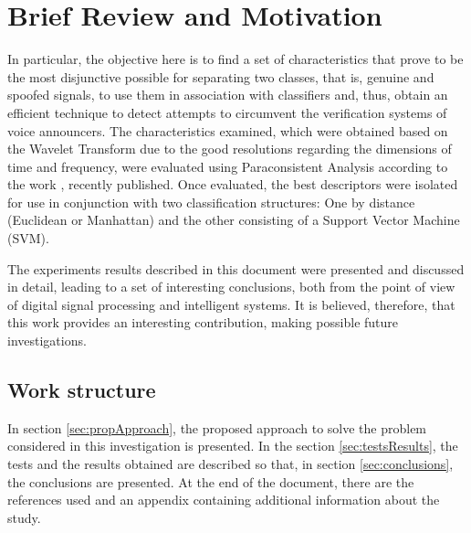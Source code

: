 \section{Brief Review and Motivation}
\label{review}
		\par In particular, the objective here is to find a set of characteristics that prove to be the most disjunctive possible for separating two classes, that is, genuine and spoofed signals, to use them in association with classifiers and, thus, obtain an efficient technique to detect attempts to circumvent the verification systems of voice announcers. The characteristics examined, which were obtained based on the Wavelet Transform due to the good resolutions regarding the dimensions of time and frequency, were evaluated using Paraconsistent Analysis according to the work \cite{8588433}, recently published. Once evaluated, the best descriptors were isolated for use in conjunction with two classification structures: One by distance (Euclidean or Manhattan) and the other consisting of a Support Vector Machine (SVM).

		\par The experiments results described in this document were presented and discussed in detail, leading to a set of interesting conclusions, both from the point of view of digital signal processing and intelligent systems. It is believed, therefore, that this work provides an interesting contribution, making possible future investigations. 
		
		\subsection{Work structure}
			\par In section \ref{sec:propApproach}, the proposed approach to solve the problem considered in this investigation is presented. In the section \ref{sec:testsResults}, the tests and the results obtained are described so that, in section \ref{sec:conclusions}, the conclusions are presented. At the end of the document, there are the references used and an appendix containing additional information about the study.